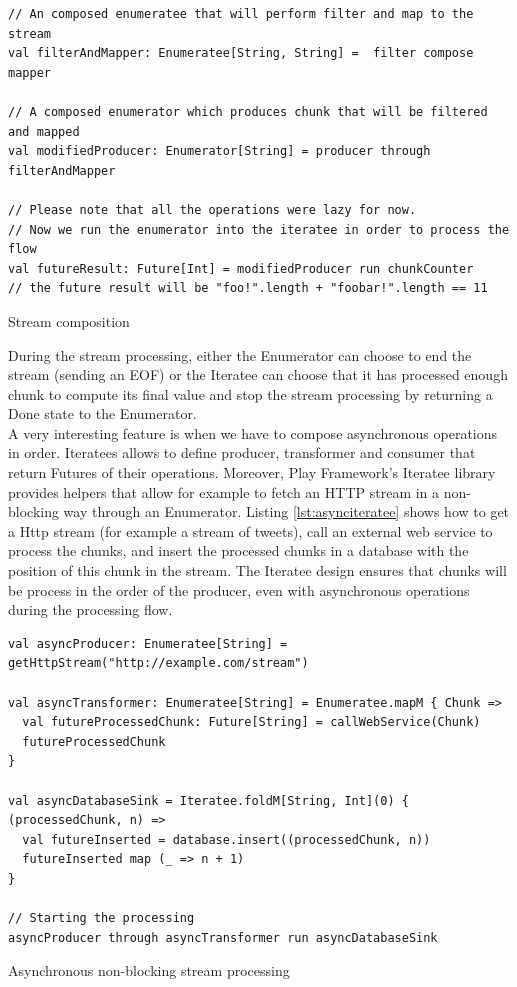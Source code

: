 \begin{listing}[h]
\begin{verbatim}
// An composed enumeratee that will perform filter and map to the stream
val filterAndMapper: Enumeratee[String, String] =  filter compose mapper

// A composed enumerator which produces chunk that will be filtered and mapped
val modifiedProducer: Enumerator[String] = producer through filterAndMapper

// Please note that all the operations were lazy for now.
// Now we run the enumerator into the iteratee in order to process the flow
val futureResult: Future[Int] = modifiedProducer run chunkCounter
// the future result will be "foo!".length + "foobar!".length == 11
\end{verbatim}
\caption{Stream composition}
\label{lst:iterateecompo}
\end{listing}

During the stream processing, either the Enumerator can choose to end the stream (sending an EOF) or the Iteratee can choose that it has processed enough
chunk to compute its final value and stop the stream processing by returning a Done state to the Enumerator.
\\

A very interesting feature is when we have to compose asynchronous operations in order. Iteratees allows to define
producer, transformer and consumer that return Futures of their operations. Moreover, Play Framework's Iteratee library
provides helpers that allow for example to fetch an HTTP stream in a non-blocking way through an Enumerator.
Listing \ref{lst:asynciteratee} shows how to get a Http stream (for example a stream of tweets), call an external web service to process
the chunks, and insert the processed chunks in a database with the position of this chunk in the stream. 
The Iteratee design ensures that chunks will be process in the order of the producer, even with asynchronous
operations during the processing flow.

\begin{listing}[h]
\begin{verbatim}
val asyncProducer: Enumeratee[String] = getHttpStream("http://example.com/stream")

val asyncTransformer: Enumeratee[String] = Enumeratee.mapM { Chunk => 
  val futureProcessedChunk: Future[String] = callWebService(Chunk)
  futureProcessedChunk
}

val asyncDatabaseSink = Iteratee.foldM[String, Int](0) { (processedChunk, n) =>
  val futureInserted = database.insert((processedChunk, n))
  futureInserted map (_ => n + 1)
}

// Starting the processing
asyncProducer through asyncTransformer run asyncDatabaseSink
\end{verbatim}
\caption{Asynchronous non-blocking stream processing}
\label{lst:asynciteratee}
\end{listing}

